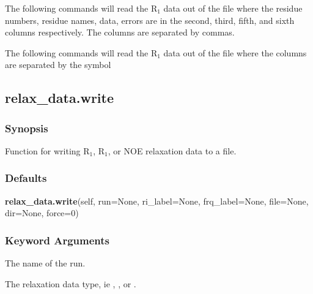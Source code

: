 
The following commands will read the R$_1$ data out of the file  where the residue numbers, residue names, data, errors are in the second, third, fifth, and sixth columns respectively.  The columns are separated by commas.




The following commands will read the R$_1$ data out of the file  where the columns are separated by the symbol \quotecmd{\%}





\newpage

\subsection{relax\_data.write}


\subsubsection{Synopsis}

Function for writing R$_1$, R$_1$, or NOE relaxation data to a file.



\subsubsection{Defaults}

\textsf{\textbf{relax\_data.write}(self, run=None, ri\_label=None, frq\_label=None, file=None, dir=None, force=0)}


\subsubsection{Keyword Arguments}

  The name of the run. 

  The relaxation data type, ie , , or . 

